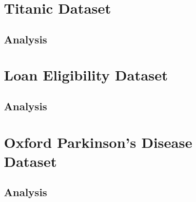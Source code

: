 \documentclass{article}
\begin{document}
\newpage
\section*{Titanic Dataset}

\subsection*{Analysis}


\newpage
\section*{Loan Eligibility Dataset}

\subsection*{Analysis}

\newpage
\section*{Oxford Parkinson's Disease Dataset}

\subsection*{Analysis}
\end{document}
